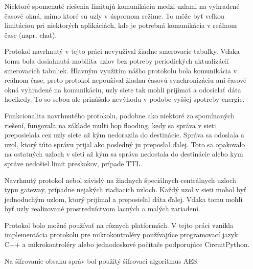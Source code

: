 \documentclass[slovak,master]{diploma}
\begin{document}
Niektoré spomenuté riešenia limitujú komunikáciu medzi uzlami na vyhradené časové okná, mimo ktoré su uzly v úspornom režime. To môže byť 
veľkou limitáciou pri niektorých aplikáciách, kde je potrebná komunikácia v reálnom čase  (napr. chat).

Protokol navrhnutý v tejto práci nevyužíval žiadne smerovacie tabuľky. Vďaka tomu bola dosiahnutá mobilita uzlov bez potreby 
periodických aktualizácií smerovacích tabuliek. Hlavným využitím nášho protokolu bola komunikácia v reálnom čase, preto protokol nepoužíval 
žiadnu časovú synchronizáciu ani časové okná vyhradené na komunikáciu, uzly siete tak mohli prijímať a odosielať dáta hocikedy.
To so sebou ale prinášalo nevýhodu v podobe vyššej spotreby energie.

Funkcionalita navrhnutého protokolu, podobne ako niektoré zo spomínaných riešení, fungovala na základe multi hop flooding, kedy sa správa v sieti preposielala cez uzly siete až kým nedorazila do destinácie.
Správa sa odoslala a uzol, ktorý túto správu prijal ako posledný ju preposlal ďalej. Toto sa opakovalo na ostatných uzloch v sieti až kým sa správa nedostala do destinácie alebo kym správe nedošiel limit preskokov, prípade TTL.

Navrhnutý protokol nebol závislý na žiadnych špeciálnych centrálnych uzloch typu gateway, prípadne nejakých riadiacich uzloch. Každý uzol v sieti mohol byť jednoduchým uzlom, ktorý prijímal a preposielal dáta ďalej.
Vďaka tomu mohli byť uzly realizované prostredníctvom lacných a malých zariadení.

Protokol bolo možné používať na rôznych platformách. V tejto práci vznikla implementácia protokolu pre mikrokontroléry používajúce programovací jazyk C++ a 
mikrokontroléry alebo jednodoskové počítače podporujúce CircuitPython.

Na šifrovanie obsahu správ bol použitý šifrovací algoritmus AES.
\end{document}
